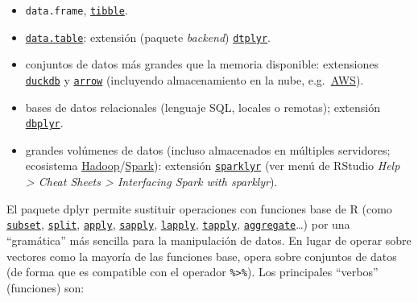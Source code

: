 \documentclass[
]{book}
\begin{document}
\begin{itemize}
\item
  \texttt{data.frame}, \href{https://tibble.tidyverse.org/}{\texttt{tibble}}.
\item
  \href{https://rdatatable.gitlab.io/data.table}{\texttt{data.table}}: extensión (paquete \emph{backend}) \href{https://dtplyr.tidyverse.org}{\texttt{dtplyr}}.
\item
  conjuntos de datos más grandes que la memoria disponible: extensiones \href{https://duckdb.org/docs/api/r}{\texttt{duckdb}} y \href{https://arrow.apache.org/docs/r/}{\texttt{arrow}} (incluyendo almacenamiento en la nube, e.g.~\href{https://aws.amazon.com/es/s3}{AWS}).
\item
  bases de datos relacionales (lenguaje SQL, locales o remotas); extensión \href{https://dbplyr.tidyverse.org}{\texttt{dbplyr}}.
\item
  grandes volúmenes de datos (incluso almacenados en múltiples servidores; ecosistema \href{http://hadoop.apache.org/}{Hadoop}/\href{https://spark.apache.org/}{Spark}): extensión \href{https://spark.rstudio.com}{\texttt{sparklyr}} (ver menú de RStudio \emph{Help \textgreater{} Cheat Sheets \textgreater{} Interfacing Spark with sparklyr}).
\end{itemize}

El paquete dplyr permite sustituir operaciones con funciones base de R (como \href{NA}{\texttt{subset}}, \href{NA}{\texttt{split}}, \href{NA}{\texttt{apply}}, \href{NA}{\texttt{sapply}}, \href{NA}{\texttt{lapply}}, \href{NA}{\texttt{tapply}}, \href{NA}{\texttt{aggregate}}\ldots) por una ``gramática'' más sencilla para la manipulación de datos.
En lugar de operar sobre vectores como la mayoría de las funciones base,
opera sobre conjuntos de datos (de forma que es compatible con el operador \texttt{\%\textgreater{}\%}).
Los principales ``verbos'' (funciones) son:
\end{document}
